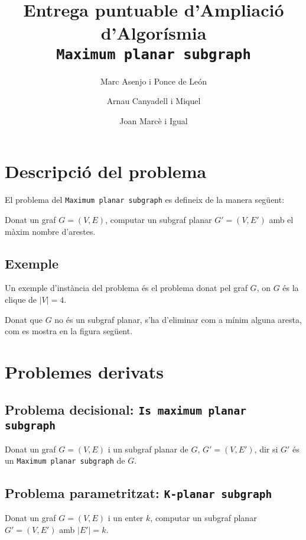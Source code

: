 \documentclass[a4paper]{article}
\title{Entrega puntuable d'Ampliació d'Algorísmia \\ \texttt{Maximum planar subgraph}}
\author{Marc Asenjo i Ponce de León \and Arnau Canyadell i Miquel \and Joan Marcè i Igual}
\date{}
\begin{document}
\maketitle

\section{Descripció del problema}
El problema del \texttt{Maximum planar subgraph} es defineix de la manera següent:

Donat un graf $G=(V,E)$, computar un subgraf planar $G'=(V,E')$ amb el màxim nombre d'arestes.

\subsection{Exemple}
Un exemple d'instància del problema és el problema donat pel graf $G$, on $G$ és la clique de $|V|=4$.

Donat que $G$ no és un subgraf planar, s'ha d'eliminar com a mínim alguna aresta, com es mostra en la figura següent.

\begin{figure}[!h]
	\centering
\end{figure}

\section{Problemes derivats}
\subsection{Problema decisional: \texttt{Is maximum planar subgraph}}
Donat un graf $G=(V,E)$ i un subgraf planar de $G$, $G'=(V,E')$, dir si $G'$ és un \texttt{Maximum planar subgraph} de $G$.

\subsection{Problema parametritzat: \texttt{K-planar subgraph}}
Donat un graf $G=(V,E)$ i un enter $k$, computar un subgraf planar $G'=(V,E')$ amb $|E'|=k$.
\end{document}
